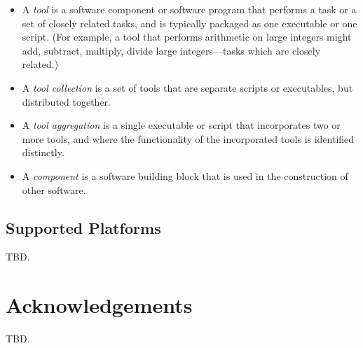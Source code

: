 \begin{itemize}
   \item A \emph{tool} is a software component
         or software program that performs a task or a set of closely related tasks, and is
         typically packaged as one executable or one script.
         (For example, a tool that performs arithmetic on large integers might add, subtract, multiply,
         divide large integers---tasks which are closely related.)
   \item A \emph{tool collection} is a set
         of tools that are separate scripts or executables, but distributed together.
   \item A \emph{tool aggregation} is a single executable or
         script that incorporates two or more tools, and where the functionality of the
         incorporated tools is identified distinctly.
   \item A \emph{component} is a software building block that
         is used in the construction of other software. 
\end{itemize}



\subsection{Supported Platforms}
\label{ciov2:sote0:ssup0}

TBD.

\section{Acknowledgements}
\label{ciov2:sack0}

TBD.



